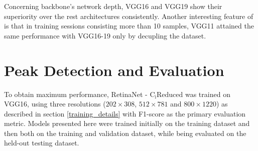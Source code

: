 Concerning backbone's network depth, VGG16 and VGG19 show their superiority over the rest architectures consistently. Another interesting feature of  is that in training sessions consisting more than 10 samples, VGG11 attained the same performance with VGG16-19 only by decupling the dataset.

\section{Peak Detection and Evaluation}
To obtain maximum performance, RetinaNet - $\text{C}_\text{i}\text{Reduced}$ was trained on VGG16, using three resolutions ($202\times308$, $512\times781$ and $800\times1220$) as described in section \ref{training_details} with F1-score as the primary evaluation metric. Models presented here were trained initially on the training dataset and then both on the training and validation dataset, while being evaluated on the held-out testing dataset.

\begin{savenotes}
\begin{table}[!htb]
  \centering
  \caption{Comparing performance of RetinaNet - $\text{C}_\text{i}\text{Reduced}$ (VGG16), trained on the training and on the combined training - validation set, with the state-of-the-art models. Parentheses indicate resolutions.}
  \label{tab6}
\end{table}
\end{savenotes}

